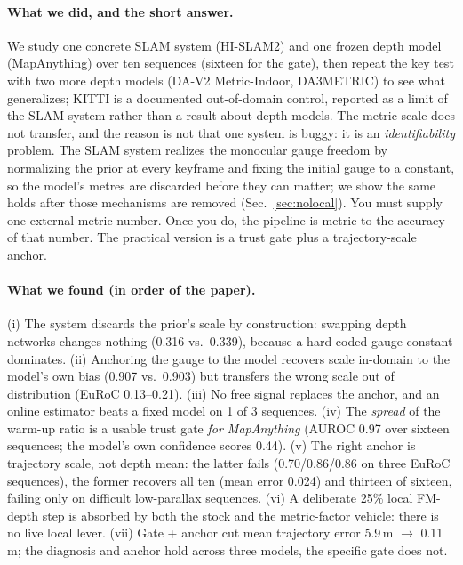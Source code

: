 \paragraph{What we did, and the short answer.} We study one concrete SLAM system
(HI-SLAM2) and one frozen depth model (MapAnything) over ten sequences (sixteen for the gate), then
repeat the key test with two more depth models (DA-V2 Metric-Indoor, DA3METRIC)
to see what generalizes; KITTI is a documented out-of-domain control, reported as
a limit of the SLAM system rather than a result about depth models. The metric
scale does not transfer, and the reason is not that one system is buggy: it is an
\emph{identifiability} problem. The SLAM system realizes the monocular gauge
freedom by normalizing the prior at every keyframe and fixing the initial gauge
to a constant, so the model's metres are discarded before they can matter; we
show the same holds after those mechanisms are removed (Sec.~\ref{sec:nolocal}). You must supply
one external metric number. Once you do, the pipeline is metric to the accuracy
of that number. The practical version is a trust gate plus a trajectory-scale
anchor.

\paragraph{What we found (in order of the paper).} (i) The system discards the
prior's scale by construction: swapping depth networks changes nothing (0.316
vs.\ 0.339), because a hard-coded gauge constant dominates. (ii) Anchoring the
gauge to the model recovers scale in-domain to the model's own bias (0.907
vs.\ 0.903) but transfers the wrong scale out of distribution (EuRoC 0.13--0.21).
(iii) No free signal replaces the anchor, and an online estimator beats a fixed
model on 1 of 3 sequences. (iv) The \emph{spread} of the warm-up ratio is a usable
trust gate \emph{for MapAnything} (AUROC 0.97 over sixteen sequences; the model's
own confidence scores 0.44). (v) The right anchor is trajectory scale, not depth mean: the latter fails
(0.70/0.86/0.86 on three EuRoC sequences), the former recovers all ten (mean
error 0.024) and thirteen of sixteen, failing only on difficult low-parallax
sequences. (vi) A deliberate 25\% local FM-depth step is absorbed by both the
stock and the metric-factor vehicle: there is no live local lever. (vii) Gate + anchor cut mean trajectory error
5.9\,m $\to$ 0.11\,m; the diagnosis and anchor hold across three models, the
specific gate does not.

